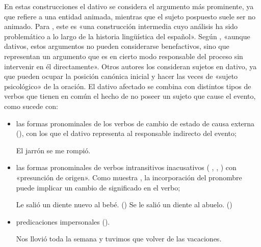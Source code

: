 \begin{recuadro}
En estas construcciones el dativo se considera el argumento más prominente, ya
que refiere a una entidad animada, mientras que el sujeto pospuesto suele ser no
animado. Para \textcite[9]{maldonado1994}, este 
es «una construcción intermedia cuyo análisis ha sido problemático a lo largo de
la historia lingüística del español». Según \textcite[103]{sanchezlopez2002},
«aunque dativos, estos argumentos no pueden considerarse benefactivos, sino que
representan un argumento que es en cierto modo responsable del proceso sin
intervenir en él directamente». Otros autores
\parencite{masullo1992,fernandezsoriano1999,mendikoetxea2011} los consideran
sujetos en dativo, ya que pueden ocupar la posición canónica inicial y hacer las
veces de «sujeto psicológico» de la oración. El dativo afectado se combina con distintos tipos de
verbos que tienen en común el hecho de no poseer un sujeto que cause el evento,
como sucede con:

\begin{itemize}
  \item las formas pronominales de los verbos de cambio de estado de causa
        externa (), con los que el dativo
        representa al responsable indirecto del evento;
        \begin{exe}
          \ex El jarrón se me rompió.
        \end{exe}
  \item las formas pronominales de verbos intransitivos inacusativos
        ( , 
        , ) con «presunción de
        origen». Como muestra , la incorporación del
        pronombre puede implicar un cambio de significado en el
        verbo;
        \begin{exe}
          \ex\label{ex:10-diente}
            \begin{xlist}
              \ex Le salió un diente nuevo al bebé. ()
              \ex Se le salió un diente al abuelo. ()
            \end{xlist}
        \end{exe}
  \item predicaciones impersonales ().
        \begin{exe}
          \ex Nos llovió toda la semana y tuvimos que volver de las vacaciones.
        \end{exe}
\end{itemize}


\end{recuadro}
